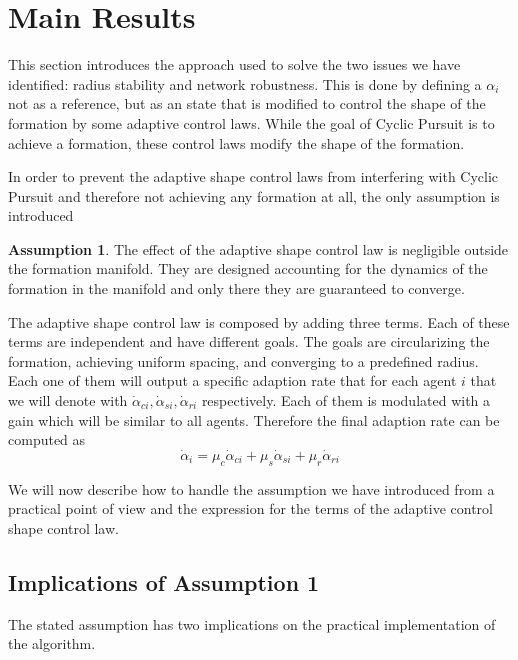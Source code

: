 \section{Main Results}

This section introduces the approach used to solve the two issues we have identified: radius stability and network robustness. This is done by defining a $\alpha_i$ not as a reference, but as an state that is modified to control the shape of the formation by some adaptive control laws. While the goal of Cyclic Pursuit is to achieve a formation, these control laws modify the shape of the formation.

In order to prevent the adaptive shape control laws from interfering with Cyclic Pursuit and therefore not achieving any formation at all, the only assumption is introduced

\textbf{Assumption 1}. The effect of the adaptive shape control law is negligible outside the formation manifold. They are designed accounting for the dynamics of the formation in the manifold and only there they are guaranteed to converge.

The adaptive shape control law is composed by adding three terms. Each of these terms are independent and have different goals. The goals are circularizing the formation, achieving uniform spacing, and converging to a predefined radius. Each one of them will output a specific adaption rate that for each agent $i$ that we will denote with $\dot{\alpha}_{ci}, \dot{\alpha}_{si}, \dot{\alpha}_{ri}$ respectively. Each of them is modulated with a gain which will be similar to all agents. Therefore the final adaption rate can be computed as
\begin{equation}
\label{adaptiveLaw}
  \dot{\alpha}_i = \mu_c \dot{\alpha}_{ci} + \mu_s \dot{\alpha}_{si} + \mu_r \dot{\alpha}_{ri}
\end{equation}

We will now describe how to handle the assumption we have introduced from a practical point of view and the expression for the terms of the adaptive control shape control law.

\subsection{Implications of Assumption 1}
The stated assumption has two implications on the practical implementation of the algorithm.

